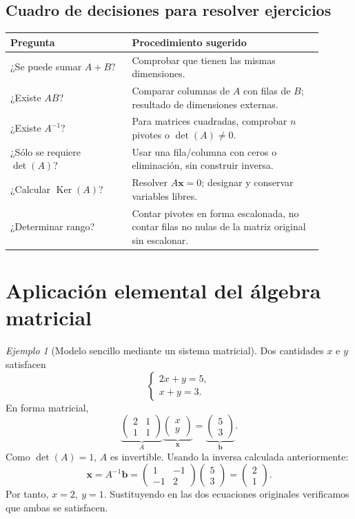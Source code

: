 \documentclass[12pt]{article}
\theoremstyle{remark}
\newtheorem{ejemplo}[definicion]{Ejemplo}
\newcommand{\Ker}{\operatorname{Ker}}
\newcommand{\vect}[1]{\boldsymbol{#1}}
\begin{document}
\subsection{Cuadro de decisiones para resolver ejercicios}
\begin{center}\small
\begin{tabular}{p{0.35\linewidth}p{0.55\linewidth}}
\toprule
\textbf{Pregunta} & \textbf{Procedimiento sugerido}\\\midrule
¿Se puede sumar $A+B$? & Comprobar que tienen las mismas dimensiones.\\
¿Existe $AB$? & Comparar columnas de $A$ con filas de $B$; resultado de dimensiones externas.\\
¿Existe $A^{-1}$? & Para matrices cuadradas, comprobar $n$ pivotes o $\det(A)\ne0$.\\
¿Sólo se requiere $\det(A)$? & Usar una fila/columna con ceros o eliminación, sin construir inversa.\\
¿Calcular $\Ker(A)$? & Resolver $A\vect x=0$; designar y conservar variables libres.\\
¿Determinar rango? & Contar pivotes en forma escalonada, no contar filas no nulas de la matriz original sin escalonar.\\
\bottomrule
\end{tabular}
\end{center}


\section{Aplicación elemental del álgebra matricial}
\begin{ejemplo}[Modelo sencillo mediante un sistema matricial]
Dos cantidades $x$ e $y$ satisfacen
\[
\begin{cases}2x+y=5,\\x+y=3.\end{cases}
\]
En forma matricial,
\[
\underbrace{\begin{pmatrix}2&1\\1&1\end{pmatrix}}_{A}
\underbrace{\begin{pmatrix}x\\y\end{pmatrix}}_{\vect{x}}
=\underbrace{\begin{pmatrix}5\\3\end{pmatrix}}_{\vect{b}}.
\]
Como $\det(A)=1$, $A$ es invertible. Usando la inversa calculada anteriormente:
\[
\vect{x}=A^{-1}\vect{b}=
\begin{pmatrix}1&-1\\-1&2\end{pmatrix}
\begin{pmatrix}5\\3\end{pmatrix}
=\begin{pmatrix}2\\1\end{pmatrix}.
\]
Por tanto, $\boxed{x=2,\ y=1}$. Sustituyendo en las dos ecuaciones originales verificamos que ambas se satisfacen.
\end{ejemplo}
\end{document}
